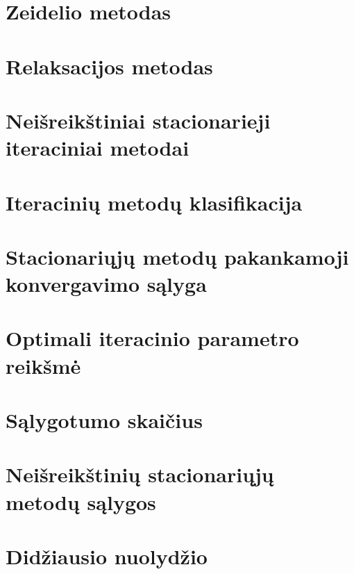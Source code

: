 \section{Zeidelio metodas}
\cite[93-96]{textbook}
\section{Relaksacijos metodas}
\cite[96-100]{textbook}
\section{Neišreikštiniai stacionarieji iteraciniai metodai}
\cite[110-112]{textbook}
\section{Iteracinių metodų klasifikacija}
\cite[104]{textbook}
\section{Stacionariųjų metodų pakankamoji konvergavimo sąlyga}
\cite[105]{textbook}
\section{Optimali iteracinio parametro reikšmė}
\cite[106]{textbook}
\section{Sąlygotumo skaičius}
\cite[107]{textbook}
\section{Neišreikštinių stacionariųjų metodų sąlygos}
\cite[109]{textbook}

\section{Didžiausio nuolydžio}
\cite[115-118]{textbook}
